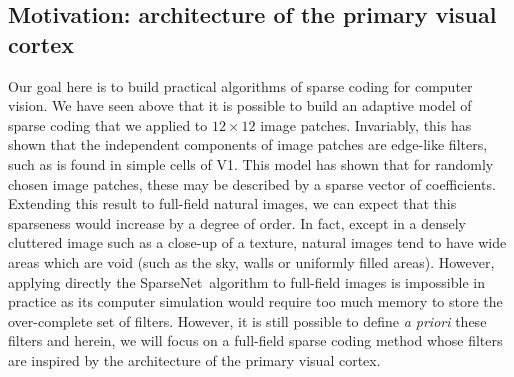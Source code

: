 \documentclass[a4paper, 11pt]{book}
\newcommand{\sparsenet}{{\sc SparseNet}}%
\begin{document}
\subsection{Motivation: architecture of the primary visual cortex}
Our goal here is to build practical algorithms of sparse coding for computer vision.
We have seen above that it is possible to build an adaptive model of sparse coding
that we applied to $12 \times 12$ image patches.
Invariably, this has shown that the independent components of image patches are edge-like filters,
such as is found in simple cells of V1.
This model has shown that for randomly chosen image patches,
these may be described by a sparse vector of coefficients.
Extending this result to full-field natural images,
we can expect that this sparseness would increase by a degree of order.
In fact, except in a densely cluttered image such as a close-up of a texture,
natural images tend to have wide areas which are void (such as the sky, walls or uniformly filled areas).
However, applying directly the \sparsenet\ algorithm to full-field images is impossible in practice
as its computer simulation would require too much memory to store the over-complete set of filters.
However, it is still possible to define \emph{a priori} these filters and herein,
we will focus on a full-field sparse coding method
whose filters are inspired by the architecture of the primary visual cortex.
\end{document}
